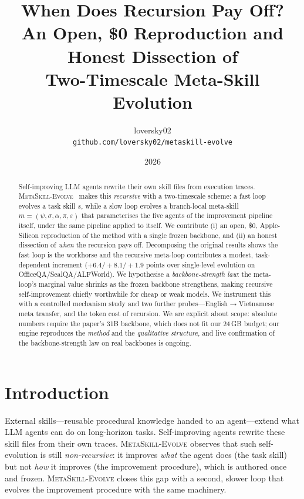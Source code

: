\documentclass[11pt]{article}
\title{When Does Recursion Pay Off?\\
\large An Open, \$0 Reproduction and Honest Dissection of\\
Two-Timescale Meta-Skill Evolution}
\author{loversky02 \\ \texttt{github.com/loversky02/metaskill-evolve}}
\date{2026}
\newcommand{\metaskill}{\textsc{MetaSkill-Evolve}}
\begin{document}
\maketitle

\begin{abstract}
Self-improving LLM agents rewrite their own skill files from execution traces.
\metaskill{}~\citep{wang2026metaskill} makes this \emph{recursive} with a
two-timescale scheme: a fast loop evolves a task skill $s$, while a slow loop
evolves a branch-local meta-skill $m=(\psi,\sigma,\alpha,\pi,\varepsilon)$ that
parameterises the five agents of the improvement pipeline itself, under the same
pipeline applied to itself. We contribute (i) an open, \$0, Apple-Silicon
reproduction of the method with a single frozen backbone, and (ii) an honest
dissection of \emph{when} the recursion pays off. Decomposing the original
results shows the fast loop is the workhorse and the recursive meta-loop
contributes a modest, task-dependent increment ($+6.4/+8.1/+1.9$ points over
single-level evolution on OfficeQA/SealQA/ALFWorld). We hypothesise a
\emph{backbone-strength law}: the meta-loop's marginal value shrinks as the frozen
backbone strengthens, making recursive self-improvement chiefly worthwhile for
cheap or weak models. We instrument this with a controlled mechanism study and
two further probes---English$\rightarrow$Vietnamese meta transfer, and the token
cost of recursion. We are explicit about scope: absolute numbers require the
paper's 31B backbone, which does not fit our 24\,GB budget; our engine reproduces
the \emph{method} and the \emph{qualitative structure}, and live confirmation of
the backbone-strength law on real backbones is ongoing.
\end{abstract}

\section{Introduction}
External skills---reusable procedural knowledge handed to an agent---extend what
LLM agents can do on long-horizon tasks. Self-improving agents rewrite these skill
files from their own traces. \metaskill{} observes that such self-evolution is
still \emph{non-recursive}: it improves \emph{what} the agent does (the task
skill) but not \emph{how} it improves (the improvement procedure), which is
authored once and frozen. \metaskill{} closes this gap with a second, slower loop
that evolves the improvement procedure with the same machinery.
\end{document}
